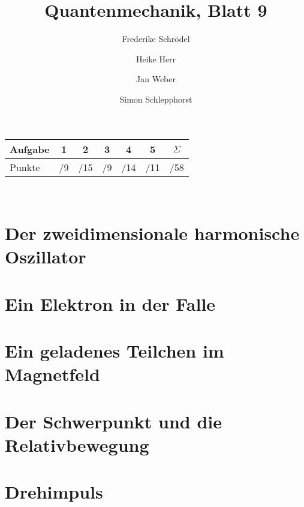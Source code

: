 \documentclass[11pt, ngerman, fleqn, DIV=15, headinclude]{scrartcl}
\title{Quantenmechanik, Blatt 9}
\author{
    Frederike Schrödel \and Heike Herr \and Jan Weber \and Simon Schlepphorst
}
\begin{document}
\maketitle
\begin{center}
	\begin{tabular}{l|c|c|c|c|c|c}
		Aufgabe &1&2&3&4&5&$\Sigma$\\
		\hline
		Punkte &\quad /9 & \quad /15 & \quad /9 & \quad /14 & \quad
		/11& \quad /58
	\end{tabular}\\
\end{center}


\section{Der zweidimensionale harmonische Oszillator}

\section{Ein Elektron in der Falle}

\section{Ein geladenes Teilchen im Magnetfeld}

\section{Der Schwerpunkt und die Relativbewegung}

\section{Drehimpuls}
\end{document}
